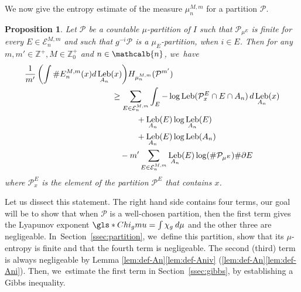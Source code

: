 \documentclass[10pt]{amsart}
\DeclareMathOperator{\Leb}{Leb}
\newcommand{\mcbn}{{\mathcalb{n}}}
\newtheorem{prop}[thm]{Proposition}
\theoremstyle{definition}
\newcommand{\bbZ}{{\mathbb{Z}}}
\begin{document}
We now give the entropy estimate of the measure $\mu_n^{M,m}$ for a partition $\mathcal{P}$.

\begin{prop}
\label{prop:entrop-estim}
Let $\mathcal{P}$ be a countable $\mu$-partition of $I$ such that $\mathcal{P}_{\mu^E}$ is finite for every $E \in \mathcal{E}_n^{M,m}$ and such that $g^{-i} \mathcal{P}$ is a $\mu_E$-partition, when $i \in E$.
Then for any $m,m' \in \bbZ^+, M \in \bbZ_0^+$ and $n \in \mcbn$, we~have
\begin{align*}
\frac{1}{m'} \left (\int \# E_n^{M,m}(x) d \Leb_{A_n}(x) \right) &H_{\mu_n^{M,m}}(\mathcal{P}^{m'})\\
&\hspace{-2em}\geq \sum_{E \in \mathcal{E}_n^{M,m}} \int_E - \log \Leb(\mathcal{P}_{x}^E \cap E \cap A_n) \,d \Leb_{A_n}(x)\\
&\hspace{1em}+ \Leb_{A_n}(E) \log \Leb_{A_n}(E)\\
&\hspace{1em}+ \Leb_{A_n}(E) \log \Leb(A_n)\\
&\hspace{-1em}- m' \sum_{E \in \mathcal{E}_n^{M,m}} \Leb_{A_n}(E) \log (\# \mathcal{P}_{\mu^E}) \# \partial E
\end{align*}
where $\mathcal{P}_x^E$ is the element of the partition $\mathcal{P}^E$ that contains $x$.
\end{prop}

Let us dissect this statement. The right hand side contains four terms, our goal will be to show that when $\mathcal{P}$ is a well-chosen partition, then the first term gives the Lyapunov exponent
$\gls*{Chi_gmu} = \int \chi_g \: d \mu$ and the other three are negligeable. In~Section~\ref{ssec:partition}, we~define this partition, show that its $\mu$-entropy is finite and that the fourth term is negligeable.
The second (\resp third) term is always negligeable by Lemma \ref{lem:def-An}\eqref{lem:def-Aniv} (\resp \ref{lem:def-An}\eqref{lem:def-Ani}).
Then, we~estimate the first term in Section~\ref{ssec:gibbs}, by establishing a Gibbs inequality.
\end{document}
